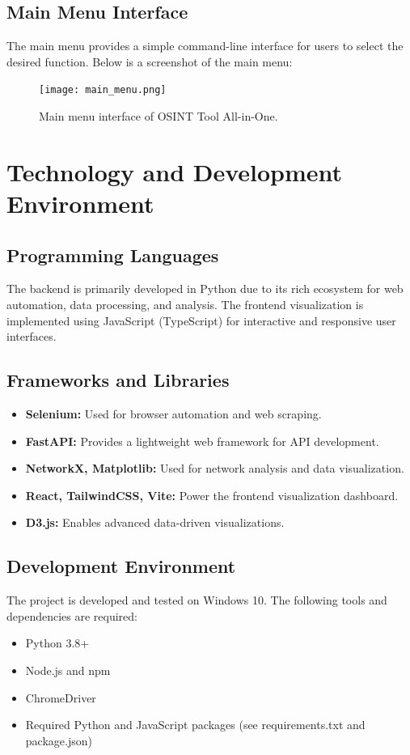 \documentclass[13pt,a4paper]{report}
\begin{document}
\section{Main Menu Interface}
The main menu provides a simple command-line interface for users to select the desired function. Below is a screenshot of the main menu:
\begin{figure}[h!]
    \centering
    \texttt{[image: main\_menu.png]}
    \caption{Main menu interface of OSINT Tool All-in-One.}
\end{figure}

\chapter{Technology and Development Environment}
\section{Programming Languages}
The backend is primarily developed in Python due to its rich ecosystem for web automation, data processing, and analysis. The frontend visualization is implemented using JavaScript (TypeScript) for interactive and responsive user interfaces.

\section{Frameworks and Libraries}
\begin{itemize}
    \item \textbf{Selenium:} Used for browser automation and web scraping.
    \item \textbf{FastAPI:} Provides a lightweight web framework for API development.
    \item \textbf{NetworkX, Matplotlib:} Used for network analysis and data visualization.
    \item \textbf{React, TailwindCSS, Vite:} Power the frontend visualization dashboard.
    \item \textbf{D3.js:} Enables advanced data-driven visualizations.
\end{itemize}

\section{Development Environment}
The project is developed and tested on Windows 10. The following tools and dependencies are required:
\begin{itemize}
    \item Python 3.8+
    \item Node.js and npm
    \item ChromeDriver
    \item Required Python and JavaScript packages (see requirements.txt and package.json)
\end{itemize}
\end{document}
